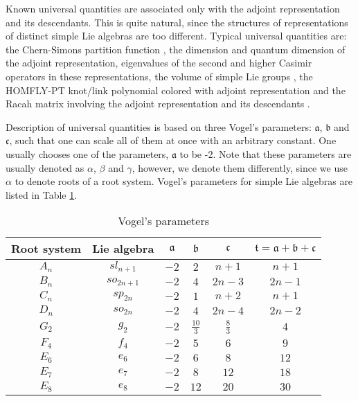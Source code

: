 \documentclass{article}
\begin{document}
Known universal quantities are associated only with the adjoint representation and its descendants. This is quite natural, since the structures of representations of distinct simple Lie algebras are too different. Typical universal quantities are: the Chern-Simons partition function \cite{MkrtVes12,Mkrt13,KreflMkrt,M2}, the dimension \cite{Vogel99} and quantum dimension \cite{Westbury03,MkrtQDims} of the adjoint representation, eigenvalues of the second and higher Casimir operators \cite{LandMan06,MkrtSergVes,ManeIsaevKrivMkrt, IsaevProv, IsaevKriv,IsaevKrivProv} in these representations, the volume of simple Lie groups \cite{KhM},
the HOMFLY-PT knot/link polynomial colored with adjoint representation \cite{MMM,MM,BM4strand} and the Racah matrix involving the adjoint representation and its descendants \cite{MM,ManeIsaevKrivMkrt, IsaevProv, IsaevKriv,IsaevKrivProv,KLS}. 

Description of universal quantities is based on three Vogel's parameters: $\mathfrak{a}$, $\mathfrak{b}$ and $\mathfrak{c}$, such that one can scale all of them at once with an arbitrary constant. One usually chooses one of the parameters, $\mathfrak{a}$ to be -2. Note that these parameters are usually denoted as $\alpha$, $\beta$ and $\gamma$, however, we denote them differently, since we use $\alpha$ to denote roots of a root system.
Vogel's parameters for simple Lie algebras are listed in Table \ref{vogelparm}.
\begin{table}[H]
\centering
\begin{tabular}{|c|c|c|c|c|c|}
\hline
Root system & Lie algebra & $\mathfrak{a}$ & $\mathfrak{b}$ & $\mathfrak{c}$ & $\mathfrak{t} = \mathfrak{a}+\mathfrak{b}+\mathfrak{c}$ \\
\hline
$A_n$ & ${sl}_{n+1}$ & $-2$ & $2$ & $n+1$ & $n+1$ \\
$B_n$ & ${so}_{2n+1}$ & $-2$ & $4$ & $2n-3$ & $2n-1$ \\
$C_n$ & ${sp}_{2n}$ & $-2$ & $1$ & $n+2$ & $n+1$ \\
$D_n$ & ${so}_{2n}$ & $-2$ & $4$ & $2n-4$ & $2n-2$ \\
$G_2$ & ${g}_2$ & $-2$ & $\frac{10}{3}$ & $\frac{8}{3}$ & $4$ \\
$F_4$ & ${f}_4$ & $-2$ & $5$ & $6$ & $9$ \\
$E_6$ & ${e}_6$ & $-2$ & $6$ & $8$ & $12$ \\
$E_7$ & ${e}_7$ & $-2$ & $8$ & $12$ & $18$ \\
$E_8$ & ${e}_8$ & $-2$ & $12$ & $20$ & $30$ \\
\hline
\end{tabular}
\caption{Vogel's parameters}
\label{vogelparm}
\end{table}
\end{document}
